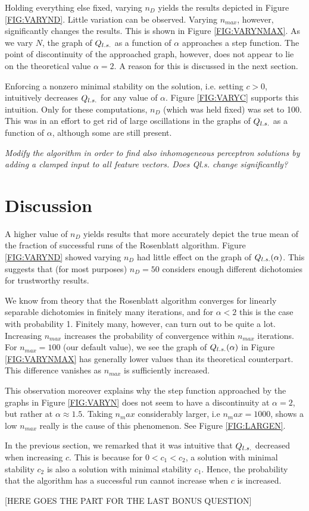 \documentclass{article}
\begin{document}
Holding everything else fixed, varying $n_D$ yields the results depicted in Figure \ref{FIG:VARYND}. Little variation can be observed. Varying $n_{max}$, however, significantly changes the results. This is shown in Figure \ref{FIG:VARYNMAX}. As we vary $N$, the graph of $Q_{l.s.}$ as a function of $\alpha$ approaches a step function. The point of discontinuity of the approached graph, however, does not appear to lie on the theoretical value $\alpha = 2$. A reason for this is discussed in the next section.

Enforcing a nonzero minimal stability on the solution, i.e. setting $c > 0$, intuitively decreases $Q_{l.s.}$ for any value of $\alpha$. Figure \ref{FIG:VARYC} supports this intuition. Only for these computations, $n_D$ (which was held fixed) was set to 100. This was in an effort to get rid of large oscillations in the graphs of $Q_{l.s.}$ as a function of $\alpha$, although some are still present.


\textit{Modify the algorithm in order to find also inhomogeneous perceptron solutions by adding a clamped input to all feature vectors. Does Ql.s. change significantly?}


\section{Discussion}
A higher value of $n_D$ yields results that more accurately depict the true mean of the fraction of successful runs of the Rosenblatt algorithm. Figure \ref{FIG:VARYND} showed varying $n_D$ had little effect on the graph of $Q_{l.s.}(\alpha)$. This suggests that (for most purposes) $n_D = 50$ considers enough different dichotomies for trustworthy results.

We know from theory that the Rosenblatt algorithm converges for linearly separable dichotomies in finitely many iterations, and for $\alpha <2$ this is the case with probability 1. Finitely many, however, can turn out to be quite a lot. Increasing $n_{max}$ increases the probability of convergence within $n_{max}$ iterations. For $n_{max} = 100$ (our default value), we see the graph of $Q_{l.s.}(\alpha)$ in Figure \ref{FIG:VARYNMAX} has generally lower values than its theoretical counterpart. This difference vanishes as $n_{max}$ is sufficiently increased.

This observation moreover explains why the step function approached by the graphs in Figure \ref{FIG:VARYN} does not seem to have a discontinuity at $\alpha = 2$, but rather at $\alpha \approx 1.5$. Taking $n_max$ considerably larger, i.e $n_max = 1000$, shows a low $n_{max}$ really is the cause of this phenomenon. See Figure \ref{FIG:LARGEN}.

In the previous section, we remarked that it was intuitive that $Q_{l.s.}$ decreased when increasing $c$. This is because for $0 < c_1 < c_2$, a solution with minimal stability $c_2$ is also a solution with minimal stability $c_1$. Hence, the probability that the algorithm has a successful run cannot increase when $c$ is increased.

[HERE GOES THE PART FOR THE LAST BONUS QUESTION] 


\nocite{*}


\end{document}
